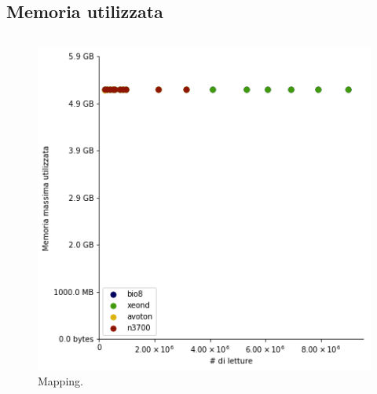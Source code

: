 \documentclass{beamer}
\begin{document}
\subsection{Memoria utilizzata}
\begin{frame}
\begin{columns}
\begin{column}{0.8\linewidth}	
\begin{figure}[H]
\centering
\includegraphics[scale=0.46]{Max_rss_mapping.png}
\caption{Mapping.}
\label{fig:RSSind}
\end{figure}
\end{column}
\end{columns}
\end{frame}
\end{document}
